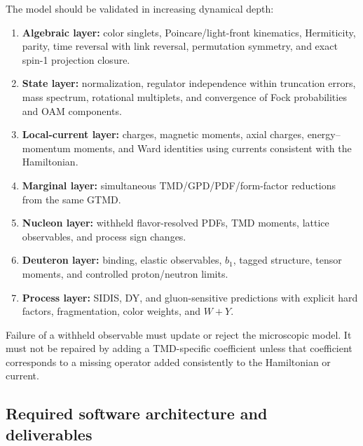 \documentclass[11pt]{article}
\begin{document}
The model should be validated in increasing dynamical depth:
\begin{enumerate}
  \item \textbf{Algebraic layer:} color singlets, Poincare/light-front
  kinematics, Hermiticity, parity, time reversal with link reversal,
  permutation symmetry, and exact spin-1 projection closure.
  \item \textbf{State layer:} normalization, regulator independence within
  truncation errors, mass spectrum, rotational multiplets, and convergence
  of Fock probabilities and OAM components.
  \item \textbf{Local-current layer:} charges, magnetic moments, axial
  charges, energy--momentum moments, and Ward identities using currents
  consistent with the Hamiltonian.
  \item \textbf{Marginal layer:} simultaneous TMD/GPD/PDF/form-factor
  reductions from the same GTMD.
  \item \textbf{Nucleon layer:} withheld flavor-resolved PDFs, TMD moments,
  lattice observables, and process sign changes.
  \item \textbf{Deuteron layer:} binding, elastic observables, \(b_1\),
  tagged structure, tensor moments, and controlled proton/neutron limits.
  \item \textbf{Process layer:} SIDIS, DY, and gluon-sensitive predictions
  with explicit hard factors, fragmentation, color weights, and \(W+Y\).
\end{enumerate}

Failure of a withheld observable must update or reject the microscopic
model.  It must not be repaired by adding a TMD-specific coefficient unless
that coefficient corresponds to a missing operator added consistently to
the Hamiltonian or current.

\subsection{Required software architecture and deliverables}
\end{document}

